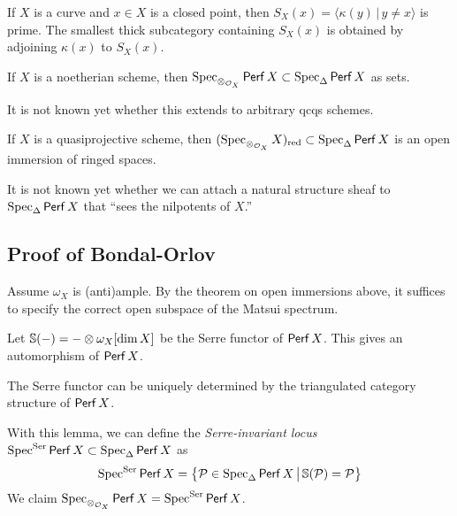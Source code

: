 \documentclass{amsart}
\begin{document}
\begin{ex}
	If $X$ is a curve and $x \in X$ is a closed point, then $S_X(x) = \langle\kappa(y) \,|\, y \neq x\rangle$ is prime.
	The smallest thick subcategory containing $S_X(x)$ is obtained by adjoining $\kappa(x)$ to $S_X(x)$.
\end{ex}

\begin{prop}[Matsui]
	If $X$ is a noetherian scheme, then $\operatorname{Spec}_{\otimes_{\mathcal{O}_X}} \mathsf{Perf}\, X \subset \operatorname{Spec}_\Delta \mathsf{Perf}\, X$ as sets.
\end{prop}

\begin{rmk}
	It is not known yet whether this extends to arbitrary qcqs schemes.
\end{rmk}

\begin{thm}
	If $X$ is a quasiprojective scheme, then $(\operatorname{Spec}_{\otimes_{\mathcal{O}_X}} X)_{\mathrm{red}} \subset \operatorname{Spec}_\Delta \mathsf{Perf}\, X$ is an open immersion of ringed spaces.
\end{thm}

\begin{rmk}
	It is not known yet whether we can attach a natural structure sheaf to $\operatorname{Spec}_\Delta \mathsf{Perf}\, X$ that ``sees the nilpotents of $X$.''
\end{rmk}

\subsection{Proof of Bondal-Orlov}

Assume $\omega_X$ is (anti)ample.
By the theorem on open immersions above, it suffices to specify the correct open subspace of the Matsui spectrum.

Let $\mathbb{S}(-) = - \otimes \omega_X[\dim X]$ be the Serre functor of $\mathsf{Perf}\, X$.
This gives an automorphism of $\mathsf{Perf}\, X$.

\begin{lem}
	The Serre functor can be uniquely determined by the triangulated category structure of $\mathsf{Perf}\, X$.
\end{lem}

With this lemma, we can define the \emph{Serre-invariant locus} $\operatorname{Spec}^{\mathrm{Ser}} \mathsf{Perf}\, X \subset \operatorname{Spec}_\Delta \mathsf{Perf}\, X$ as 
\[
	\operatorname{Spec}^{\mathrm{Ser}} \mathsf{Perf}\, X = \big\{ \mathcal{P} \in \operatorname{Spec}_\Delta \mathsf{Perf}\, X \,\big|\, \mathbb{S}(\mathcal{P}) = \mathcal{P} \big\}
\]
We claim $\operatorname{Spec}_{\otimes_{\mathcal{O}_X}} \mathsf{Perf}\, X = \operatorname{Spec}^{\mathrm{Ser}} \mathsf{Perf}\, X$.
\end{document}
